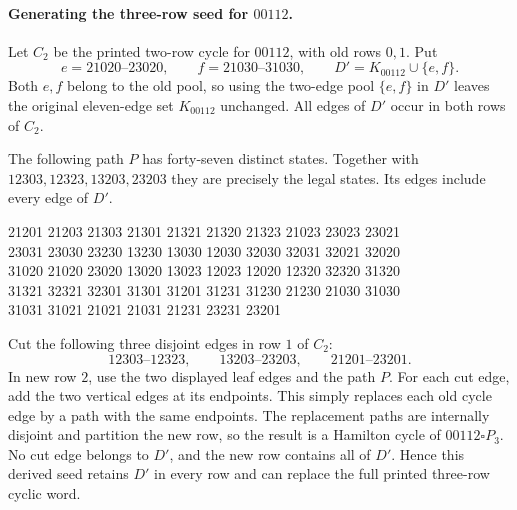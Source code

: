 \paragraph{Generating the three-row seed for $00112$.}
Let $C_2$ be the printed two-row cycle for $00112$, with old rows
$0,1$. Put
\[
e=21020\text{--}23020,\qquad f=21030\text{--}31030,
\qquad D'=K_{00112}\cup\{e,f\}.
\]
Both $e,f$ belong to the old pool, so using the two-edge pool
$\{e,f\}$ in $D'$ leaves the original eleven-edge set $K_{00112}$
unchanged. All edges of $D'$ occur in both rows of $C_2$.

The following path $P$ has forty-seven distinct states. Together
with $12303,12323,13203,23203$ they are precisely the legal states.
Its edges include every edge of $D'$.
\begingroup\small\ttfamily\begin{flushleft}
21201 21203 21303 21301 21321 21320 21323 21023 23023 23021\\
23031 23030 23230 13230 13030 12030 32030 32031 32021 32020\\
31020 21020 23020 13020 13023 12023 12020 12320 32320 31320\\
31321 32321 32301 31301 31201 31231 31230 21230 21030 31030\\
31031 31021 21021 21031 21231 23231 23201
\end{flushleft}\endgroup

Cut the following three disjoint edges in row $1$ of $C_2$:
\[
12303\text{--}12323,\qquad
13203\text{--}23203,\qquad
21201\text{--}23201.
\]
In new row $2$, use the two displayed leaf edges and the path $P$.
For each cut edge, add the two vertical edges at its endpoints.
This simply replaces each old cycle edge by a path with the same
endpoints. The replacement paths are internally disjoint and
partition the new row, so the result is a Hamilton cycle of
$00112\square P_3$. No cut edge belongs to $D'$, and the new row
contains all of $D'$. Hence this derived seed retains $D'$ in every
row and can replace the full printed three-row cyclic word.

